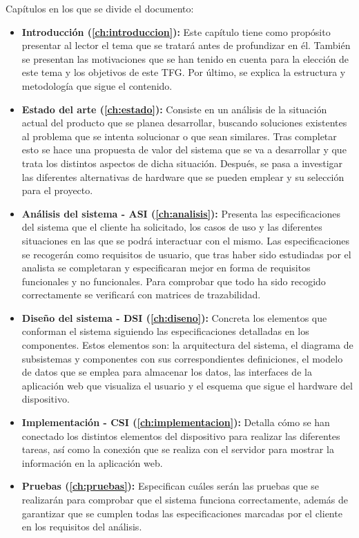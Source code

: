 Capítulos en los que se divide el documento:

\begin{itemize}
	\item \textbf{Introducción (\autoref{ch:introduccion}):} Este capítulo tiene como propósito presentar al lector el tema que se tratará antes de profundizar en él. También se presentan las motivaciones que se han tenido en cuenta para la elección de este tema y los objetivos de este TFG. Por último, se explica la estructura y metodología que sigue el contenido.
	\item \textbf{Estado del arte (\autoref{ch:estado}):} Consiste en un análisis de la situación actual del producto que se planea desarrollar, buscando soluciones existentes al problema que se intenta solucionar o que sean similares. Tras completar esto se hace una propuesta de valor del sistema que se va a desarrollar y que trata los distintos aspectos de dicha situación. Después, se pasa a investigar las diferentes alternativas de hardware que se pueden emplear y su selección para el proyecto.
	\item \textbf{Análisis del sistema - ASI (\autoref{ch:analisis}):} Presenta las especificaciones del sistema que el cliente ha solicitado, los casos de uso y las diferentes situaciones en las que se podrá interactuar con el mismo. Las especificaciones se recogerán como requisitos de usuario, que tras haber sido estudiadas por el analista se completaran y especificaran mejor en forma de requisitos funcionales y no funcionales. Para comprobar que todo ha sido recogido correctamente se verificará con matrices de trazabilidad.
	\item \textbf{Diseño del sistema - DSI (\autoref{ch:diseno}):} Concreta los elementos que conforman el sistema siguiendo las especificaciones detalladas en los componentes. Estos elementos son: la arquitectura del sistema, el diagrama de subsistemas y componentes con sus correspondientes definiciones, el modelo de datos que se emplea para almacenar los datos, las interfaces de la aplicación web que visualiza el usuario y el esquema que sigue el hardware del dispositivo. 
	\item \textbf{Implementación - CSI (\autoref{ch:implementacion}):} Detalla cómo se han conectado los distintos elementos del dispositivo para realizar las diferentes tareas, así como la conexión que se realiza con el servidor para mostrar la información en la aplicación web.
	\item \textbf{Pruebas (\autoref{ch:pruebas}):} Especifican cuáles serán las pruebas que se realizarán para comprobar que el sistema funciona correctamente, además de garantizar que se cumplen todas las especificaciones marcadas por el cliente en los requisitos del análisis.

\end{itemize}
